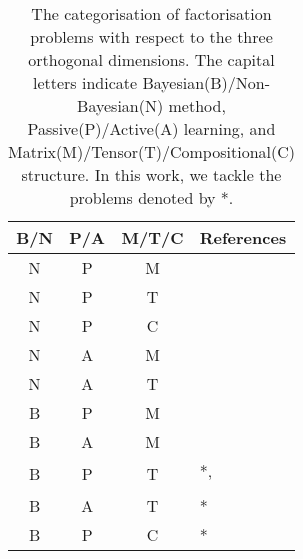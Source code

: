\begin{table}[t]
\centering
\caption{\label{tbl:relatedwork}The categorisation of factorisation problems with respect to the three orthogonal dimensions. The capital letters indicate Bayesian(B)/Non-Bayesian(N) method, Passive(P)/Active(A) learning, and Matrix(M)/Tensor(T)/Compositional(C) structure. In this work, we tackle the problems denoted by *.}
\vskip 0.15in
\begin{tabular}{c c c l}
B/N & P/A & M/T/C & References	\\ \hline \hline

N & P & M & \citet{lee1999learning}\\ \hline

\multirow{2}{*}{N} & \multirow{2}{*}{P} & \multirow{2}{*}{T}& \citet{nickel2011three}\\
& & & \citet{kolda2009tensor}\\ \hline

N & P & C & \citet{Neelakantan2015} \\ \hline

N & A & M & \citet{ruchansky2015matrix}\\  \hline

N & A & T & \citet{kajino2015active} \\  \hline


B & P & M & \citet{mnih2007probabilistic}\\ \hline

\multirow{2}{*}{B} & \multirow{2}{*}{A} & \multirow{2}{*}{M}&  \citet{kawale2015efficient} \\
& & & \citet{sutherland2013active}\\ \hline

\multirow{2}{*}{B} & \multirow{2}{*}{P} & \multirow{2}{*}{T}& *, \citet{xiong2010temporal}\\
& & & \citet{schmidt2009probabilistic} \\ \hline

B & A & T & * \\ \hline

B & P & C & * \\ 

\end{tabular}
\end{table}

